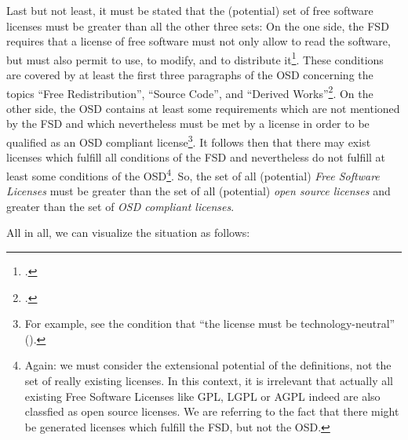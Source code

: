 Last but not least, it must be stated that the (potential) set of free software
licenses must be greater than all the other three sets: On the one side, the FSD
requires that a license of free software must not only allow to read the
software, but must also permit to use, to modify, and to distribute
it\footcite[cf.][41]{Stallman1996a}. These conditions are covered by at least
the first three paragraphs of the OSD concerning the topics \enquote{Free
Redistribution}, \enquote{Source Code}, and \enquote{Derived
Works}\footcite[cf.][\nopage wp]{OSI2012a}. On the other side, the OSD contains
at least some requirements which are not mentioned by the FSD and which
nevertheless must be met by a license in order to be qualified as an OSD
compliant license\footnote{For example, see the condition that \enquote{the
license must be technology-neutral} (\cite[cf.][\nopage wp]{OSI2012a}).}. It
follows then that there may exist licenses which fulfill all conditions of the
FSD and nevertheless do not fulfill at least some conditions of the
OSD\footnote{Again: we must consider the extensional potential of the
definitions, not the set of really existing licenses. In this context, it is
irrelevant that actually all existing Free Software Licenses like GPL, LGPL or
AGPL indeed are also classfied as open source licenses. We are referring to the
fact that there might be generated licenses which fulfill the FSD, but not the
OSD.}. So, the set of all (potential) \emph{Free Software Licenses} must be
greater than the set of all (potential) \emph{open source licenses} and greater
than the set of \emph{OSD compliant licenses}.

All in all, we can visualize the situation as follows:

